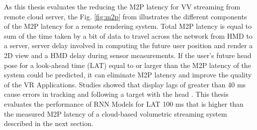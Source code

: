 As this thesis evaluates the reducing the M2P latency for VV streaming from remote cloud server, the Fig. \ref{fig:m2p} from \cite{serhan_cloud_streaming} illustrates the different components of the M2P latency for a remote rendering system. Total M2P latency is equal to sum of the time taken by a bit of data to travel across the network from HMD to a server, server delay involved in computing the future user position and render a 2D view and a HMD delay during sensor measurements. If the user’s future head pose for a look-ahead time (LAT) equal to or larger than the M2P latency of the system could be predicted, it can eliminate M2P latency and improve the quality of the VR Applications. Studies showed that display lags of greater than 40 ms cause errors in tracking and following a target with the head \cite{delay_sickness}. This thesis evaluates the performance of RNN Models for LAT 100 ms that is higher than the measured M2P latency of a cloud-based volumetric streaming system described in the next section. 

